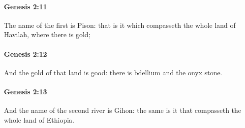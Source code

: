 		\paragraph{Genesis 2:11} %
			\label{GENESIS-2-11}

			The name of the first is Pison: that is it which compasseth the whole land of Havilah, where there is gold;


		\paragraph{Genesis 2:12} %
			\label{GENESIS-2-12}

			And the gold of that land is good: there is bdellium and the onyx stone.


		\paragraph{Genesis 2:13} %
			\label{GENESIS-2-13}

			And the name of the second river is Gihon: the same is it that compasseth the whole land of Ethiopia.



